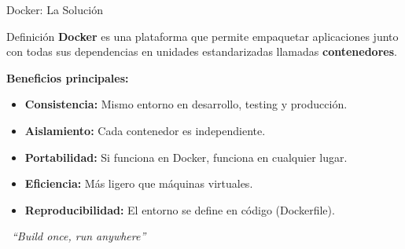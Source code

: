 \documentclass[aspectratio=169]{beamer}
\begin{document}
\begin{frame}{Docker: La Solución}
    \begin{block}{Definición}
        \textbf{Docker} es una plataforma que permite empaquetar aplicaciones junto con todas sus dependencias en unidades estandarizadas llamadas \textbf{contenedores}.
    \end{block}
    
    \vspace{0.3cm}
    \textbf{Beneficios principales:}
    \begin{itemize}
        \item \textbf{Consistencia:} Mismo entorno en desarrollo, testing y producción.
        \item \textbf{Aislamiento:} Cada contenedor es independiente.
        \item \textbf{Portabilidad:} Si funciona en Docker, funciona en cualquier lugar.
        \item \textbf{Eficiencia:} Más ligero que máquinas virtuales.
        \item \textbf{Reproducibilidad:} El entorno se define en código (Dockerfile).
    \end{itemize}
    
    \vspace{0.3cm}
    \centering
    \faDocker \ \textit{``Build once, run anywhere''}
\end{frame}
\end{document}
